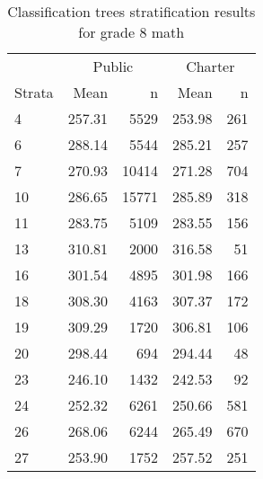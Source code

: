 \begin{table}[h!]
\centering
\caption{Classification trees stratification results for grade 8 math} 
\label{g8math-circpsa-tree}
\begin{tabular}{lrr@{\extracolsep{.2cm}}rr}
  \hline
   & \multicolumn{2}{c}{Public} & \multicolumn{2}{c}{Charter} \\ \cline{2-3} \cline{4-5} Strata & Mean & n & Mean & n \\ \hline
4 & 257.31 & 5529 & 253.98 & 261 \\ 
  6 & 288.14 & 5544 & 285.21 & 257 \\ 
  7 & 270.93 & 10414 & 271.28 & 704 \\ 
  10 & 286.65 & 15771 & 285.89 & 318 \\ 
  11 & 283.75 & 5109 & 283.55 & 156 \\ 
  13 & 310.81 & 2000 & 316.58 &  51 \\ 
  16 & 301.54 & 4895 & 301.98 & 166 \\ 
  18 & 308.30 & 4163 & 307.37 & 172 \\ 
  19 & 309.29 & 1720 & 306.81 & 106 \\ 
  20 & 298.44 & 694 & 294.44 &  48 \\ 
  23 & 246.10 & 1432 & 242.53 &  92 \\ 
  24 & 252.32 & 6261 & 250.66 & 581 \\ 
  26 & 268.06 & 6244 & 265.49 & 670 \\ 
  27 & 253.90 & 1752 & 257.52 & 251 \\ 
   \hline
\end{tabular}
\end{table}
